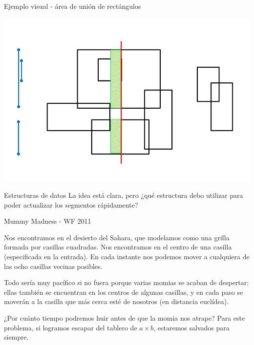 \documentclass[compress]{beamer}
\begin{document}
\begin{frame}{Ejemplo visual - área de unión de rectángulos}
\begin{center}
\includegraphics[scale=0.4]{images/sweep_line_11.png}
\end{center}
\end{frame}

\begin{frame}{Estructuras de datos}
La idea está clara, pero ¿qué estructura debo utilizar para poder actualizar
los segmentos rápidamente?


\end{frame}

\begin{frame}{Mummy Madness - WF 2011}

Nos encontramos en el desierto del Sahara, que modelamos como una grilla
formada por casillas cuadradas. Nos encontramos en el centro de una casilla
(especificada en la entrada). En cada instante nos podemos mover a cualquiera 
de las ocho casillas vecinas posibles.
\bigskip

Todo sería muy pacífico si no fuera porque varias momias se acaban de despertar:
ellas también se encuentran en los centros de algunas casillas, y en cada
paso se moverán a la casilla que más cerca esté de nosotros (en distancia euclídea).

\bigskip

¿Por cuánto tiempo podremos huir antes de que la momia nos atrape? Para este
problema, si logramos escapar del tablero de $a \times b$, estaremos salvados
para siempre.

\end{frame}
\end{document}
